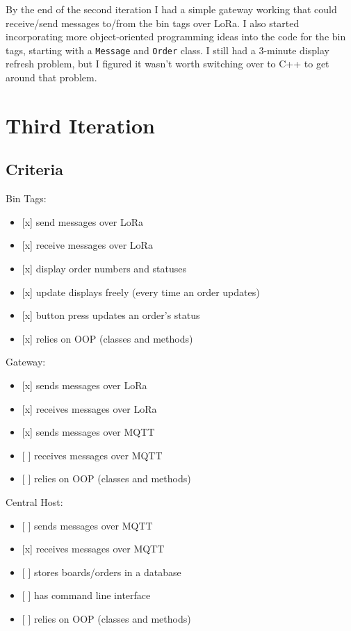 \documentclass{article}
\begin{document}
By the end of the second iteration I had a simple gateway working that
could receive/send messages to/from the bin tags over LoRa. I also
started incorporating more object-oriented programming ideas into the
code for the bin tags, starting with a \texttt{Message} and
\texttt{Order} class. I still had a 3-minute display refresh problem,
but I figured it wasn't worth switching over to C++ to get around that
problem.

\section{Third Iteration}\label{third-iteration}

\subsection{Criteria}\label{criteria-3}

\noindent
Bin Tags:

\begin{itemize}
\item
  {[}x{]} send messages over LoRa
\item
  {[}x{]} receive messages over LoRa
\item
  {[}x{]} display order numbers and statuses
\item
  {[}x{]} update displays freely (every time an order updates)
\item
  {[}x{]} button press updates an order's status
\item
  {[}x{]} relies on OOP (classes and methods)
\end{itemize}

\noindent
Gateway:

\begin{itemize}
\item
  {[}x{]} sends messages over LoRa
\item
  {[}x{]} receives messages over LoRa
\item
  {[}x{]} sends messages over MQTT
\item
  {[} {]} receives messages over MQTT
\item
  {[} {]} relies on OOP (classes and methods)
\end{itemize}

\noindent
Central Host:

\begin{itemize}
\item
  {[} {]} sends messages over MQTT
\item
  {[}x{]} receives messages over MQTT
\item
  {[} {]} stores boards/orders in a database
\item
  {[} {]} has command line interface
\item
  {[} {]} relies on OOP (classes and methods)
\end{itemize}
\end{document}
